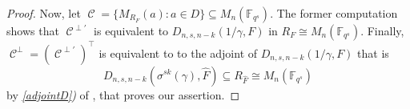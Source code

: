 \documentclass[10pt,a4paper]{amsart}
\DeclareMathOperator{\C}{\mathcal{C}}
\newcommand{\F}{{\mathbb F}}
\begin{document}
\begin{proof}
Now, let  \(
\C=\{M_{R_F}(a) \colon a \in D\} \subseteq M_n(\F_{q^s}). \)
The former computation shows that $\C^{\perp'}$ is equivalent to $D_{n,s,n-k}(1/\gamma,F)$ in $R_F \cong M_n(\F_{q^s})$. Finally, $\C^{\perp}=(\C^{\perp'})^{\top}$ is equivalent to to the adjoint of $D_{n,s,n-k}(1/\gamma,F)$ that is
\[
D_{n,s,n-k}(\sigma^{sk}(\gamma),\hat{F}) \subseteq R_{\hat{F}} \cong M_n(\F_{q^s})
\]
by \emph{\ref{adjointD})} of , that proves our assertion.
\end{proof}
\end{document}

